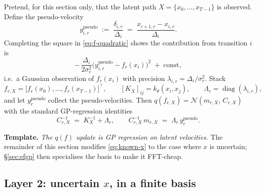 \documentclass[11pt]{article}
\newcommand{\diag}{\operatorname{diag}}
\begin{document}
Pretend, for this section only, that the latent path
$X = \{x_0,\ldots,x_{T-1}\}$ is observed. Define the pseudo-velocity
\begin{equation}
y_{i,r}^{\text{pseudo}}
\;:=\; \frac{\delta_{i,r}}{\Delta_i}
\;=\; \frac{x_{i+1,r}-x_{i,r}}{\Delta_i}.
\end{equation}
Completing the square in \eqref{eq:f-quadratic} shows the contribution from
transition $i$ is
\begin{equation}
-\,\frac{\Delta_i}{2\sigma_r^2}
\bigl(y_{i,r}^{\text{pseudo}} - f_r(x_i)\bigr)^{\!2}
\;+\; \text{const},
\end{equation}
i.e.\ a Gaussian observation of $f_r(x_i)$ with precision
$\lambda_{i,r} = \Delta_i/\sigma_r^2$. Stack
\begin{equation}
f_{r,X} = \bigl[f_r(x_0),\ldots,f_r(x_{T-1})\bigr]^{\!\top}\!,
\qquad [K_X]_{ij} = k_\theta(x_i,x_j),
\qquad \Lambda_r = \diag(\lambda_{i,r}),
\end{equation}
and let $y_r^{\text{pseudo}}$ collect the pseudo-velocities. Then
$q(f_{r,X}) = \mathcal{N}(m_{r,X},\,C_{r,X})$ with the standard GP-regression
identities
\begin{equation}
\boxed{\;
C_{r,X}^{-1} \;=\; K_X^{-1} + \Lambda_r,
\qquad
C_{r,X}^{-1}\, m_{r,X} \;=\; \Lambda_r\, y_r^{\text{pseudo}}.
\;}
\label{eq:known-x}
\end{equation}

\medskip
\noindent
\textbf{Template.} \emph{The $q(f)$ update is GP regression on latent
velocities.} The remainder of this section modifies \eqref{eq:known-x} to
the case where $x$ is uncertain; §\ref{sec:efgp} then specialises the basis
to make it FFT-cheap.

\subsection{Layer 2: uncertain $x$, in a finite basis}
\label{sec:uncertain-x}
\end{document}
